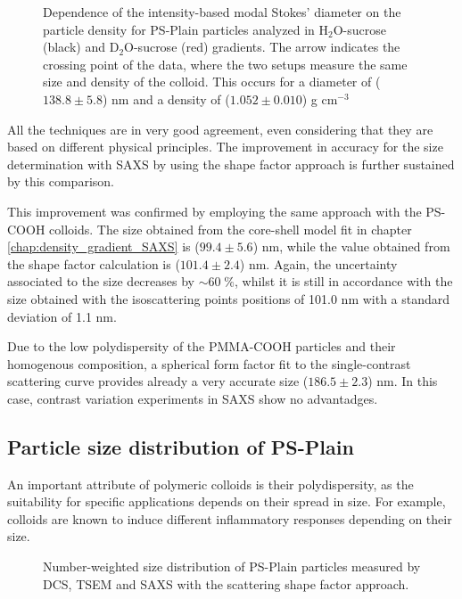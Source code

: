 \begin{figure}
	\begin{center}
		
	\end{center}
	\caption{Dependence of the intensity-based modal Stokes' diameter on the particle density for PS-Plain particles analyzed in H$_2$O-sucrose (black) and D$_2$O-sucrose (red) gradients. The arrow indicates the crossing point of the data, where the two setups measure the same size and density of the colloid. This occurs for a diameter of ($138.8\pm5.8$) nm and a density of ($1.052\pm0.010$) g cm$^{-3}$}
	\label{fig:DCSCombinedStokes}
\end{figure}
 
All the techniques are in very good agreement, even considering that they are based on different physical principles. The improvement in accuracy for the size determination with SAXS by using the shape factor approach is further sustained by this comparison. 

This improvement was confirmed by employing the same approach with the PS-COOH colloids. The size obtained from the core-shell model fit in chapter \ref{chap:density_gradient_SAXS} is ($99.4\pm5.6$) nm, while the value obtained from the shape factor calculation is ($101.4\pm2.4$) nm. Again, the uncertainty associated to the size decreases by $\sim 60\;\%$, whilst it is still in accordance with the size obtained with the isoscattering points positions of 101.0 nm with a standard deviation of 1.1 nm. 

Due to the low polydispersity of the PMMA-COOH particles and their homogenous composition, a spherical form factor fit to the single-contrast scattering curve provides already a very accurate size ($186.5\pm2.3$) nm. In this case, contrast variation experiments in SAXS show no advantadges.

\subsection{Particle size distribution of PS-Plain}

An important attribute of polymeric colloids is their polydispersity, as the suitability for specific applications depends on their spread in size. For example, colloids are known to induce different inflammatory responses depending on their size\citep{kusaka_effect_2014}.

\begin{figure}
	\begin{center}
		
	\end{center}
	\caption{Number-weighted size distribution of PS-Plain particles measured by DCS, TSEM \citep{nicolet_inter-laboratory_2016} and SAXS with the scattering shape factor approach.}
	\label{fig:PSPlainSizeDistribution}
\end{figure}

